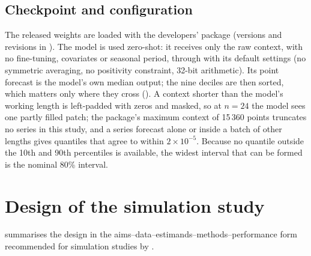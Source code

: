 \subsection{Checkpoint and configuration}
\label{sec:tfm-config}

The released weights are loaded with the developers'  package (versions and revisions in
). The model is used zero-shot: it receives only the raw context, with no fine-tuning,
covariates or seasonal period, through  with its default settings (no symmetric
averaging, no positivity constraint, 32-bit arithmetic). Its point forecast is the model's own median
output; the nine deciles are then sorted, which matters only where they cross (). A
context shorter than the model's working length is left-padded with zeros and masked, so at $n = 24$ the
model sees one partly filled patch; the package's maximum context of 15\,360 points truncates no series in
this study, and a series forecast alone or inside a batch of other lengths gives quantiles that agree to
within $2 \times 10^{-5}$. Because no quantile outside the 10th and 90th percentiles is available, the widest
interval that can be formed is the nominal 80\% interval.

\section{Design of the simulation study}
\label{sec:design}

 summarises the design in the aims--data--estimands--methods--performance form
recommended for simulation studies by \citet{morris2019simulation}.

